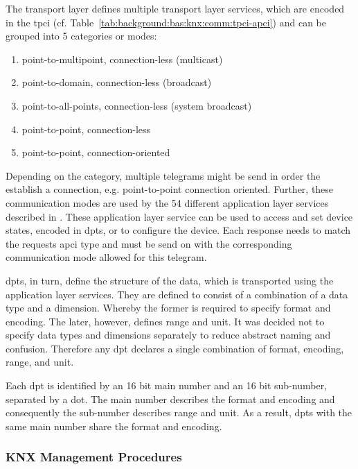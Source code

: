 The transport layer defines multiple transport layer services, which are encoded in the \gls{tpci} (cf. Table~\ref{tab:background:bas:knx:comm:tpci-apci}) and can be grouped into 5 categories or modes: 

\begin{enumerate}
	\item point-to-multipoint, connection-less (multicast)
	\item point-to-domain, connection-less (broadcast)
	\item point-to-all-points, connection-less (system broadcast)
	\item point-to-point, connection-less
	\item point-to-point, connection-oriented
\end{enumerate}
\parencite[cf.][p.~30]{DIN_EN_50090-4-2}

Depending on the category, multiple telegrams might be send in order the establish a connection, e.g. point-to-point connection oriented.
Further, these communication modes are used by the 54 different application layer services described in \textcite{DIN_EN_50090-4-1}.
These application layer service can be used to access and set device states, encoded in \glspl{dpt}, or to configure the device.
Each response needs to match the requests \gls{apci} type and must be send on with the corresponding communication mode allowed for this telegram. \parencite[][pp.~9--10]{DIN_EN_50090-4-1}

\glspl{dpt}, in turn, define the structure of the data, which is transported using the application layer services.
They are defined to consist of a combination of a data type and a dimension. Whereby the former is required to specify format and encoding. The later, however, defines range and unit.
It was decided not to specify data types and dimensions separately to reduce abstract naming and confusion.
Therefore any \gls{dpt} declares a single combination of format, encoding, range, and unit. \parencite[p.~38]{DIN_EN_50090-3-3}

Each \gls{dpt} is identified by an 16 bit main number and an 16 bit sub-number, separated by a dot. The main number describes the format and encoding and consequently the sub-number describes range and unit. As a result, \glspl{dpt} with the same main number share the format and encoding.


	
\subsubsection{KNX Management Procedures}
\label{sec:background:bas:knx:management}

